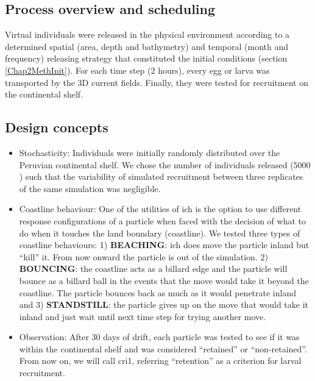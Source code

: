\subsection{Process overview and scheduling}\label{Chap2MethProc}

Virtual individuals were released in the physical environment according to a determined spatial (area, depth and bathymetry) and temporal (month and frequency) releasing strategy that constituted the initial conditions (section \ref{Chap2MethInit}). For each time step (2 hours), every egg or larva was transported by the 3D current fields. Finally, they were tested for recruitment on the continental shelf.\\

\subsection{Design concepts}\label{Chap2MethDesi}

\begin{itemize}

\item Stochasticity: Individuals were initially randomly distributed over the Peruvian continental shelf. We chose the number of individuals released ($5000$) such that the variability of simulated recruitment between three replicates of the same simulation was negligible.\\

\item Coastline behaviour: One of the utilities of \gls{ich} is the option to use different response configurations of a particle when faced with the decision of what to do when it touches the land boundary (coastline). We tested three types of coastline behaviours: 1) \textbf{BEACHING}: \gls{ich} does move the particle inland but ``kill'' it. From now onward the particle is out of the simulation. 2) \textbf{BOUNCING}: the coastline acts as a billard edge and the particle will bounce as a billard ball in the events that the move would take it beyond the coastline. The particle bounces back as much as it would penetrate inland and 3) \textbf{STANDSTILL}: the particle gives up on the move that would take it inland and just wait until next time step for trying another move.\\

\item Observation: After 30 days of drift, each particle was tested to see if it was within the continental shelf and was considered ``retained'' or ``non-retained''. From now on, we will call \gls{cri1}, referring ``retention'' as a criterion for larval recruitment.\\

\end{itemize}

